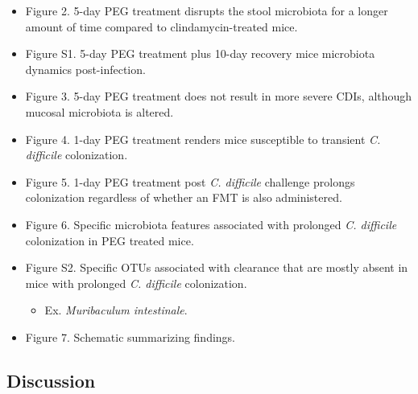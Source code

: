 \documentclass[
  11pt,
]{article}
\providecommand{\tightlist}{%
  \setlength{\itemsep}{0pt}\setlength{\parskip}{0pt}}
\begin{document}
\begin{itemize}
\item
  Figure 2. 5-day PEG treatment disrupts the stool microbiota for a
  longer amount of time compared to clindamycin-treated mice.
\item
  Figure S1. 5-day PEG treatment plus 10-day recovery mice microbiota
  dynamics post-infection.
\item
  Figure 3. 5-day PEG treatment does not result in more severe CDIs,
  although mucosal microbiota is altered.
\item
  Figure 4. 1-day PEG treatment renders mice susceptible to transient
  \emph{C. difficile} colonization.
\item
  Figure 5. 1-day PEG treatment post \emph{C. difficile} challenge
  prolongs colonization regardless of whether an FMT is also
  administered.
\item
  Figure 6. Specific microbiota features associated with prolonged
  \emph{C. difficile} colonization in PEG treated mice.
\item
  Figure S2. Specific OTUs associated with clearance that are mostly
  absent in mice with prolonged \emph{C. difficile} colonization.

  \begin{itemize}
  \tightlist
  \item
    Ex. \emph{Muribaculum intestinale}.
  \end{itemize}
\item
  Figure 7. Schematic summarizing findings.
\end{itemize}

\hypertarget{discussion}{%
\subsection{Discussion}\label{discussion}}
\end{document}
